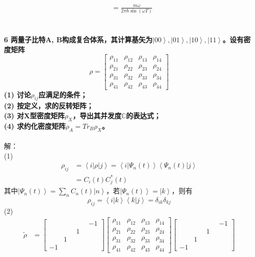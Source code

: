 \documentclass[12pt]{article}
\numberwithin{equation}{section}	 %
\begin{document}
\begin{spacing}{1.5}
\begin{align*}
&= \frac{m\omega}{2\pi\hbar\sin(\omega T)}
\end{align*}
~\\
~\\
\textbf{6 \quad 两量子比特A, B构成复合体系，其计算基矢为$\left|00\right>,\left|01\right>,\left|10\right>,\left|11\right>$。设有密度矩阵
\begin{equation}\nonumber 		%
\rho = \begin{bmatrix} \rho_{11} & \rho_{12} & \rho_{13} & \rho_{14} \\ \rho_{21} & \rho_{22} & \rho_{23} & \rho_{24} \\ \rho_{31} & \rho_{32} & \rho_{33} & \rho_{34} \\ \rho_{41} & \rho_{42} & \rho_{43} & \rho_{44} \end{bmatrix}
\end{equation}
(1) 讨论$\rho_{ij}$应满足的条件；\\
(2) 按定义，求的反转矩阵；\\
(3) 对X型密度矩阵$\rho_{X}$，导出其并发度$\mathbb{C}$的表达式；\\
(4) 求约化密度矩阵$\rho_{A}=Tr_{B}\rho_{X}$。}\\
~\\
解：\\
(1) 
\begin{align*}
\rho_{ij} &= \left<i\left|\rho\right|j\right> = \left<i|\Psi_{n}(t)\right>\left<\Psi_{n}(t)|j\right> \\
&= C_{i}(t)C^{*}_{j}(t)
\end{align*}
其中$\displaystyle \left|\Psi_{n}(t)\right> = \sum_{n}C_{n}(t)\left|n\right>$，若$\displaystyle \left|\Psi_{n}(t)\right> = \left|k\right>$，则有
\begin{equation}
\rho_{ij} = \left<i|k\right>\left<k|j\right> =\delta_{ik}\delta_{kj}
\end{equation}
(2) 
\begin{align*}
\tilde{\rho} &= \begin{bmatrix} \quad & \quad & \quad & -1 \\ \quad & \quad & 1 &\quad \\ \quad & 1 & \quad & \quad \\ -1 & \quad & \quad & \quad \end{bmatrix}   \begin{bmatrix} \rho_{11} & \rho_{12} & \rho_{13} & \rho_{14} \\ \rho_{21} & \rho_{22} & \rho_{23} & \rho_{24} \\ \rho_{31} & \rho_{32} & \rho_{33} & \rho_{34} \\ \rho_{41} & \rho_{42} & \rho_{43} & \rho_{44} \end{bmatrix}   \begin{bmatrix} \quad & \quad & \quad & -1 \\ \quad & \quad & 1 &\quad \\ \quad & 1 & \quad & \quad \\ -1 & \quad & \quad & \quad \end{bmatrix} \\

\end{align*}
\end{spacing}
\end{document}
